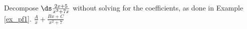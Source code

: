 {Decompose $\ds \frac{2x+5}{x^3+7x}$ without solving for the coefficients, as done in Example \ref{ex_pf1}.}
{$\frac{A}{x} + \frac{Bx+C}{x^2+7}$}
